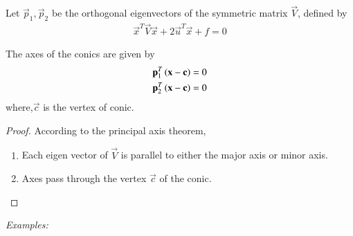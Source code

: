 \begin{lemma}
    Let $\vec{p}_1, \vec{p}_2$ be the orthogonal eigenvectors of the symmetric matrix $\vec{V}$, defined by 
    \begin{align}
        \vec{x}^T\vec{V}\vec{x} + 2\vec{u}^T\vec{x} + f =0
    \end{align}
    
The axes of the conics are given by 
\begin{align}
    \mathbf{p}_1^T\left(\mathbf{x}-\mathbf{c}\right) &= 0
    \\
    \mathbf{p}_2^T\left(\mathbf{x}-\mathbf{c}\right) &= 0
\end{align}
where,$\vec{c}$ is the vertex of conic.
\end{lemma}

\begin{proof}
According to the principal axis theorem,
\begin{enumerate}
    \item Each eigen vector of $\vec{V}$ is parallel to either the major axis or minor axis.
    \item Axes pass through the vertex $\vec{c}$ of the conic.
\end{enumerate}

\end{proof}
{\em Examples: }
